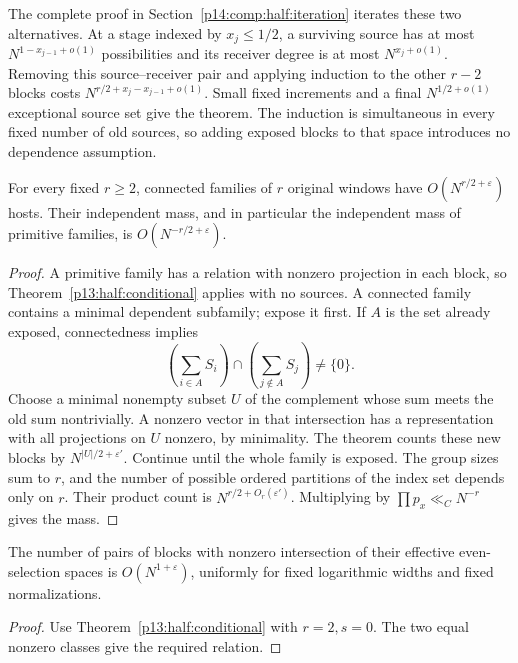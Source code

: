 The complete proof in Section~\ref{p14:comp:half:iteration} iterates
these two alternatives.  At a stage indexed by $x_j\le1/2$, a surviving
source has at most $N^{1-x_{j-1}+o(1)}$ possibilities and its receiver
degree is at most $N^{x_j+o(1)}$.  Removing this source--receiver pair
and applying induction to the other $r-2$ blocks costs
$N^{r/2+x_j-x_{j-1}+o(1)}$.  Small fixed increments and a final
$N^{1/2+o(1)}$ exceptional source set give the theorem.
The induction is simultaneous in every fixed number of old sources,
so adding exposed blocks to that space introduces no dependence
assumption.

\begin{corollary}
\label{p13:half:connected}
For every fixed \(r\ge2\), connected families of \(r\)
original windows have \(O(N^{r/2+\varepsilon})\) hosts.
Their independent mass, and in particular the independent
mass of primitive families, is \(O(N^{-r/2+\varepsilon})\).
\end{corollary}

\begin{proof}
A primitive family has a relation with nonzero projection
in each block, so Theorem~\ref{p13:half:conditional} applies
with no sources.
A connected family contains a minimal dependent subfamily;
expose it first. If \(A\) is the set already exposed,
connectedness implies
\[
 \left(\sum_{i\in A}S_i\right)
 \cap\left(\sum_{j\notin A}S_j\right)\ne\{0\}.
\]
Choose a minimal nonempty subset \(U\) of the complement
whose sum meets the old sum nontrivially.
A nonzero vector in that intersection has a representation
with all projections on \(U\) nonzero, by minimality.
The theorem counts these new blocks by
\(N^{|U|/2+\varepsilon'}\). Continue until the whole
family is exposed.
The group sizes sum to \(r\), and the number of possible
ordered partitions of the index set depends only on \(r\).
Their product count is \(N^{r/2+O_r(\varepsilon')}\).
Multiplying by \(\prod p_x\ll_C N^{-r}\) gives the mass.
\end{proof}

\begin{corollary}
\label{p13:half:pairs}
The number of pairs of blocks with nonzero intersection
of their effective even-selection spaces is
\(O(N^{1+\varepsilon})\), uniformly for fixed logarithmic
widths and fixed normalizations.
\end{corollary}

\begin{proof}
Use Theorem~\ref{p13:half:conditional} with \(r=2,s=0\).
The two equal nonzero classes give the required relation.
\end{proof}

